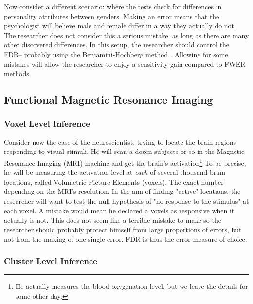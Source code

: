 \documentclass[draft,12pt]{article}
\begin{document}
Now consider a different scenario: where the tests check for differences in personality attributes between genders. Making an error means that the psychologist will believe male and female differ in a way they actually do not. The researcher does not consider this a serious mistake, as long as there are many other discovered differences. In this setup, the researcher should control the FDR-- probably using the Benjamini-Hochberg method \citep{benjamini_controlling_1995}. Allowing for some mistakes will allow the researcher to enjoy a sensitivity gain compared to FWER methods.


\subsection{Functional Magnetic Resonance Imaging}
\subsubsection{Voxel Level Inference}
Consider now the case of the neuroscientist, trying to locate the brain regions responding to visual stimuli. He will scan a dozen subjects or so in the Magnetic Resonance Imaging (MRI) machine and get the brain's activation\footnote{ He actually measures the blood oxygenation level, but we leave the details for some other day.} To be precise, he will be measuring the activation level at \emph{each} of several thousand brain locations, called Volumetric Picture Elements (voxels). The exact number depending on the MRI's resolution. 
In the aim of finding "active" locations, the researcher will want to test the null hypothesis of "no response to the stimulus" at each voxel. A mistake would mean he declared a voxels as responsive when it actually is not. This does not seem like a terrible mistake to make so the researcher should probably protect himself from large proportions of errors, but not from the making of one single error. FDR is thus the error measure of choice.


\subsubsection{Cluster Level Inference}
\end{document}
